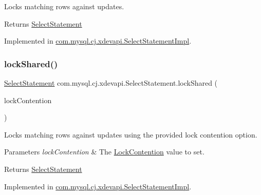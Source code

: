 Locks matching rows against updates.

\begin{DoxyReturn}{Returns}
\mbox{\hyperlink{interfacecom_1_1mysql_1_1cj_1_1xdevapi_1_1_select_statement}{Select\+Statement}} 
\end{DoxyReturn}


Implemented in \mbox{\hyperlink{classcom_1_1mysql_1_1cj_1_1xdevapi_1_1_select_statement_impl_a4c2746728bcf0ed59e1604d57f94f8b2}{com.\+mysql.\+cj.\+xdevapi.\+Select\+Statement\+Impl}}.

\mbox{\label{interfacecom_1_1mysql_1_1cj_1_1xdevapi_1_1_select_statement_a2ada4b9bb1be4e07ef8593ff9e777ad0}} 
\subsubsection{\texorpdfstring{lock\+Shared()}{lockShared()}\hspace{0.1cm}{\footnotesize\ttfamily [2/2]}}
{\footnotesize\ttfamily \mbox{\hyperlink{interfacecom_1_1mysql_1_1cj_1_1xdevapi_1_1_select_statement}{Select\+Statement}} com.\+mysql.\+cj.\+xdevapi.\+Select\+Statement.\+lock\+Shared (\begin{DoxyParamCaption}\item[{Lock\+Contention}]{lock\+Contention }\end{DoxyParamCaption})}

Locks matching rows against updates using the provided lock contention option.


\begin{DoxyParams}{Parameters}
{\em lock\+Contention} & The \mbox{\hyperlink{}{Lock\+Contention}} value to set. \\
\hline
\end{DoxyParams}
\begin{DoxyReturn}{Returns}
\mbox{\hyperlink{interfacecom_1_1mysql_1_1cj_1_1xdevapi_1_1_select_statement}{Select\+Statement}} 
\end{DoxyReturn}


Implemented in \mbox{\hyperlink{classcom_1_1mysql_1_1cj_1_1xdevapi_1_1_select_statement_impl_a94383dd2bc539f35e3faa4de023248a1}{com.\+mysql.\+cj.\+xdevapi.\+Select\+Statement\+Impl}}.

